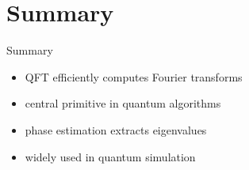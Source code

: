 \documentclass{beamer}
\begin{document}
\section{Summary}

\begin{frame}{Summary}

\begin{itemize}
\item QFT efficiently computes Fourier transforms
\item central primitive in quantum algorithms
\item phase estimation extracts eigenvalues
\item widely used in quantum simulation
\end{itemize}

\end{frame}
\end{document}
